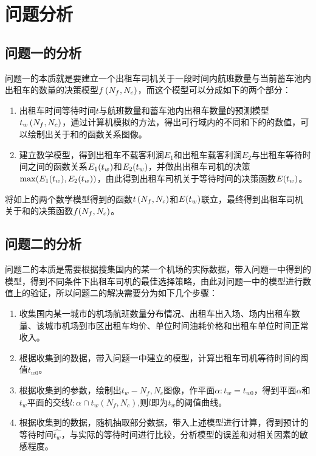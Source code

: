 \documentclass{cumcm}
\begin{document}
\section{问题分析}
\subsection{问题一的分析}
问题一的本质就是要建立一个出租车司机关于一段时间内航班数量\flightnum 与当前蓄车池内出租车的数量\taxinum 的决策模型$f\left(\mbox{$N_f$},\mbox{$N_c$}\right)$，而这个模型可以分成如下的两个部分：
\begin{enumerate}[(1)]
	\item 出租车时间等待时间$t$与航班数量\flightnum 和蓄车池内出租车数量\taxinum 的预测模型$\mbox{$t_w$}\left(\mbox{$N_f$},\mbox{$N_c$}\right)$，通过计算机模拟的方法，得出可行域内的不同\flightnum 和\taxinum 下的\waittime 的数值，可以绘制出\waittime 关于\flightnum 和\taxinum 的函数关系图像。
	\item 建立数学模型，得到出租车不载客利润$E_1$和出租车载客利润$E_2$与出租车等待时间\waittime 之间的函数关系$E_1(\mbox{$t_w$})$和$E_2(\mbox{$t_w$})$，并做出出租车司机的决策$\max(E_1(\mbox{$t_w$}),E_2(\mbox{$t_w$}))$，由此得到出租车司机关于等待时间的决策函数$E(\mbox{$t_w$})$。
\end{enumerate}
\par
将如上的两个数学模型得到的函数$t\left(\mbox{$N_f$},\mbox{$N_c$}\right)$和$E(\mbox{$t_w$})$联立，最终得到出租车司机关于\flightnum 和\taxinum 的决策函数$f(\mbox{$N_f$},\mbox{$N_c$})$。

\subsection{问题二的分析}
问题二的本质是需要根据搜集国内的某一个机场的实际数据，带入问题一中得到的模型，得到不同条件下出租车司机的最佳选择策略，由此对问题一中的模型进行数值上的验证，所以问题二的解决需要分为如下几个步骤：
\begin{enumerate}[(1)]
	\item 收集国内某一城市的机场航班数量分布情况、出租车出入场、场内出租车数量、该城市机场到市区出租车均价、单位时间油耗价格和出租车单位时间正常收入。
	\item 根据收集到的数据，带入问题一中建立的模型，计算出租车司机等待时间的阈值$t_{w0}$。
	\item 根据收集到的参数，绘制出$t_w-N_f,N_c$图像，作平面$\alpha:t_w=t_{w0}$，得到平面$\alpha$和$t_w$平面的交线$l:\alpha\cap t_w(N_f,N_c)$,则$l$即为$t_w$的阈值曲线。
	\item 根据收集到的数据，随机抽取部分数据，带入上述模型进行计算，得到预计的等待时间$\hat{t_w}$，与实际的等待时间进行比较，分析模型的误差和对相关因素的敏感程度。
\end{enumerate}
\end{document}
